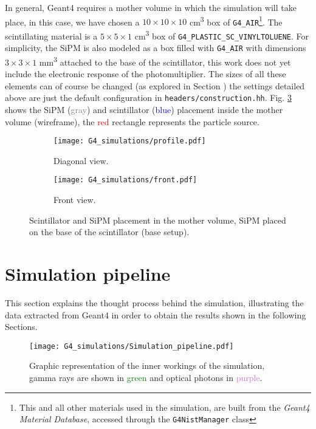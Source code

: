 In general, Geant4 requires a mother volume in which the simulation will take place, in this case, we have chosen a $10\times10\times10$ \unit{\cm\cubed} box of \texttt{G4\_AIR}\footnote{This and all other materials used in the simulation, are built from the \textit{Geant4 Material Database}, accessed through the \texttt{G4NistManager} class}. The scintillating material is a $5\times5\times1$ \unit{\cm\cubed} box of \texttt{G4\_PLASTIC\_SC\_VINYLTOLUENE}. For simplicity, the SiPM is also modeled as a box filled with \texttt{G4\_AIR} with dimensions $3\times3\times1$ \unit{\mm\cubed} attached to the base of the scintillator, this work does not yet include the electronic response of the photomultiplier. The sizes of all these elements can of course be changed (as explored in Section ) the settings detailed above are just the default configuration in \texttt{headers/construction.hh}. Fig. \ref{fig:geometry} shows the SiPM (\textcolor{Gray}{gray}) and scintillator (\textcolor{blue}{blue}) placement inside the mother volume (wireframe), the \textcolor{red}{red} rectangle represents the particle source.

\begin{figure}[H]
  \centering
  \begin{subfigure}[t]{0.48\textwidth}
    \texttt{[image: G4\_simulations/profile.pdf]}
    \caption{\label{sfig:geometry_profile}Diagonal view.}
  \end{subfigure}
  \hfill
  \begin{subfigure}[t]{0.48\textwidth}
    \texttt{[image: G4\_simulations/front.pdf]}
    \caption{\label{sfig:geometry_front}Front view.}
  \end{subfigure}
  \caption{\label{fig:geometry}Scintillator and SiPM placement in the mother volume, SiPM placed on the base of the scintillator (base setup).}
\end{figure}

\section{Simulation pipeline}

This section explains the thought process behind the simulation, illustrating the data extracted from Geant4 in order to obtain the results shown in the following Sections.

\begin{figure}[H]
  \centering
    \texttt{[image: G4\_simulations/Simulation\_pipeline.pdf]}
  \caption{\label{fig:sim_pipeline}Graphic representation of the inner workings of the simulation, gamma rays are shown in \textcolor{green}{green} and optical photons in \textcolor{Orchid}{purple}.}
\end{figure}

